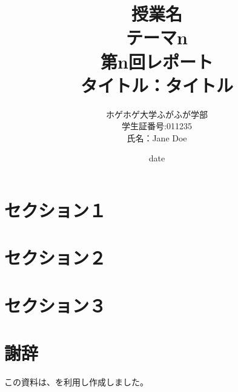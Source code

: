 \documentclass[autodetect-engine,dvipdfmx-if-dvi,ja=standard,a4paper,12pt]{bxjsarticle}
\begin{document}
\title{授業名\\
テーマn\\  
第n回レポート \\
タイトル：タイトル
}
\date{date}


\author{ホゲホゲ大学ふがふが学部 \\ 
学生証番号:011235 \\
氏名：Jane Doe}



\maketitle
\begin{abstract}


\end{abstract} 

\newpage

\tableofcontents %

\newpage

\section{セクション１}
\newpage


\section{セクション２}
\newpage

\section{セクション３}
\newpage

\section*{謝辞}

この資料は、\cite{template}を利用し作成しました。
\end{document}
